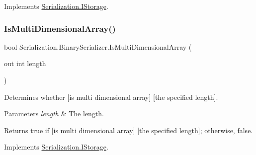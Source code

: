 Implements \hyperlink{interface_serialization_1_1_i_storage_a167bf2c224e928c05446f0fde56e9d8d}{Serialization.\+I\+Storage}.

\mbox{\label{class_serialization_1_1_binary_serializer_a87e06dfca74d1ebc475999bd0c2f9596}} 
\subsubsection{\texorpdfstring{Is\+Multi\+Dimensional\+Array()}{IsMultiDimensionalArray()}}
{\footnotesize\ttfamily bool Serialization.\+Binary\+Serializer.\+Is\+Multi\+Dimensional\+Array (\begin{DoxyParamCaption}\item[{out int}]{length }\end{DoxyParamCaption})\hspace{0.3cm}{\ttfamily [inline]}}



Determines whether \mbox{[}is multi dimensional array\mbox{]} \mbox{[}the specified length\mbox{]}. 


\begin{DoxyParams}{Parameters}
{\em length} & The length.\\
\hline
\end{DoxyParams}
\begin{DoxyReturn}{Returns}
{\ttfamily true} if \mbox{[}is multi dimensional array\mbox{]} \mbox{[}the specified length\mbox{]}; otherwise, {\ttfamily false}.
\end{DoxyReturn}


Implements \hyperlink{interface_serialization_1_1_i_storage_a9fd65cc423dabd2b49021e0e7f333356}{Serialization.\+I\+Storage}.

\mbox{\label{class_serialization_1_1_binary_serializer_a82cdd27cb419e14f93f62e0947d3c109}} 
